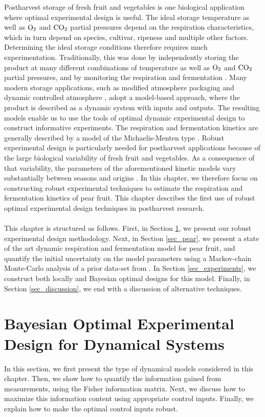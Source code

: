 Postharvest storage of fresh fruit and vegetables is one biological application where optimal experimental design is useful. The ideal storage temperature as well as $\text{O}_2$ and $\text{CO}_2$ partial pressures depend on the respiration characteristics, which in turn depend on species, cultivar, ripeness and multiple other factors. Determining the ideal storage conditions therefore requires much experimentation. Traditionally, this was done by independently storing the product at many different combinations of temperature as well as $\text{O}_2$ and $\text{CO}_2$ partial pressures, and by monitoring the respiration and fermentation \parencite{saltveit}. Many modern storage applications, such as modified atmosphere packaging \parencite{fonseca} and dynamic controlled atmosphere \parencite{bessemans}, adopt a model-based approach, where the product is described as a dynamic system with inputs and outputs. The resulting models enable us to use the tools of optimal dynamic experimental design to construct informative experiments. The respiration and fermentation kinetics are generally described by a model of the Michaelis-Menten type \parencite{hertog}. Robust experimental design is particularly needed for postharvest applications because of the large biological variability of fresh fruit and vegetables. As a consequence of that variability, the parameters of the aforementioned kinetic models vary substantially between seasons and origins {\color{red}\parencite{tri}}. In this chapter, we therefore focus on constructing robust experimental techniques to estimate the respiration and fermentation kinetics of pear fruit. This chapter describes the first use of robust optimal experimental design techniques in postharvest research.
\\
\\
This chapter is structured as follows. First, in Section \ref{sec_OED}, we present our robust experimental design methodology. Next, in Section \ref{sec_pear}, we present a state of the art dynamic respiration and fermentation model for pear fruit, and quantify the initial uncertainty on the model parameters using a Markov-chain Monte-Carlo analysis of a prior data-set from \textcite{ho}. In Section \ref{sec_experiments}, we construct both locally and Bayesian optimal designs for this model. Finally, in Section \ref{sec_discussion}, we end with a discussion of alternative techniques.
\section{Bayesian Optimal Experimental Design for Dynamical Systems}
\label{sec_OED}
In this section, we first present the type of dynamical models considered in this chapter. Then, we show how to quantify the information gained from measurements, using the Fisher information matrix. Next, we discuss how to maximize this information content using appropriate control inputs. Finally, we explain how to make the optimal control inputs robust.
